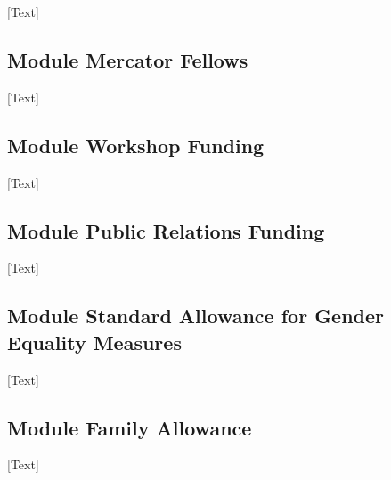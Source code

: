 \documentclass[11pt]{article} %
\begin{document}
[Text]

\subsection{ Module Mercator Fellows }

[Text]

\subsection{ Module Workshop Funding }

[Text]

\subsection{ Module Public Relations Funding }

[Text]

\subsection{ Module Standard Allowance for Gender Equality Measures }

[Text]

\subsection{ Module Family Allowance }

[Text]
\end{document}
